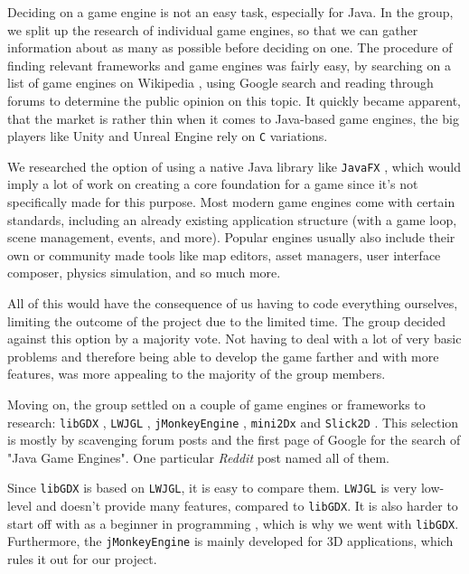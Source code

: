 \documentclass[12p]{article}
\begin{document}
Deciding on a game engine is not an easy task, especially for Java. In the group, we split up the research of individual game engines, so that we can gather information about as many as possible before deciding on one. The procedure of finding relevant frameworks and game engines was fairly easy, by searching on a list of game engines on Wikipedia \cite{ListOfGameEngines}, using Google search and reading through forums to determine the public opinion on this topic. It quickly became apparent, that the market is rather thin when it comes to Java-based game engines, the big players like Unity \cite{UnityGameEngine} and Unreal Engine \cite{UnrealEngine} rely on \texttt{C} variations.

We researched the option of using a native Java library like \texttt{JavaFX} \cite{JavaFX}, which would imply a lot of work on creating a core foundation for a game since it's not specifically made for this purpose. Most modern game engines come with certain standards, including an already existing application structure (with a game loop, scene management, events, and more). Popular engines usually also include their own or community made tools like map editors, asset managers, user interface composer, physics simulation, and so much more.

All of this would have the consequence of us having to code everything ourselves, limiting the outcome of the project due to the limited time. The group decided against this option by a majority vote. Not having to deal with a lot of very basic problems and therefore being able to develop the game farther and with more features, was more appealing to the majority of the group members.

Moving on, the group settled on a couple of game engines or frameworks to research: \texttt{libGDX} \cite{LibGDX}, \texttt{LWJGL} \cite{LWJGL}, \texttt{jMonkeyEngine} \cite{jMonkeyEngine}, \texttt{mini2Dx} \cite{mini2Dx} and \texttt{Slick2D} \cite{Slick2D}. This selection is mostly by scavenging forum posts and the first page of Google for the search of "Java Game Engines". One particular \emph{Reddit} post \cite{RedditJavaGameEngines} named all of them.

Since \texttt{libGDX} is based on \texttt{LWJGL}, it is easy to compare them. \texttt{LWJGL} is very low-level and doesn't provide many features, compared to \texttt{libGDX}. It is also harder to start off with as a beginner in programming \cite{StackExchangeLibGDXLWJGL}, which is why we went with \texttt{libGDX}. Furthermore, the \texttt{jMonkeyEngine} is mainly developed for 3D applications, which rules it out for our project. 
\end{document}
